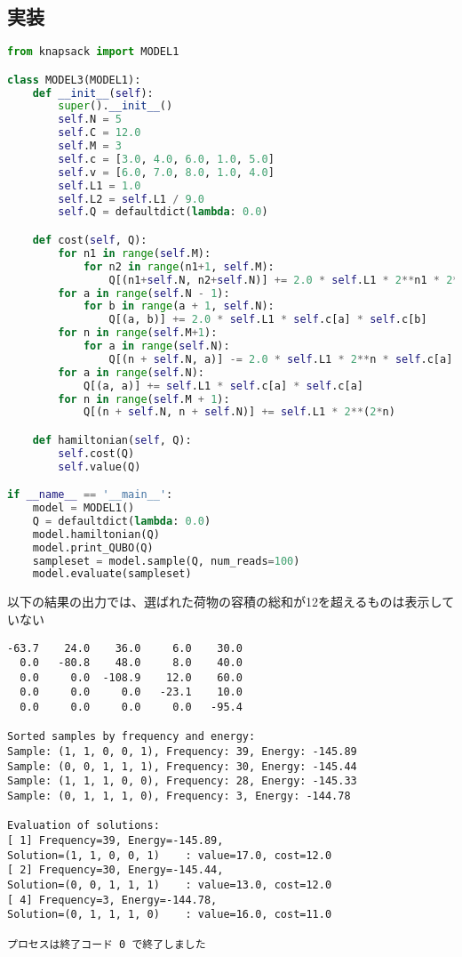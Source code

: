 \documentclass[uplatex,dvipdfmx,a4paper,11pt,oneside,openany]{jsbook}
\begin{document}
\subsection{実装}

\begin{lstlisting}[language=Python]
from knapsack import MODEL1

class MODEL3(MODEL1):
    def __init__(self):
        super().__init__()
        self.N = 5
        self.C = 12.0
        self.M = 3
        self.c = [3.0, 4.0, 6.0, 1.0, 5.0]
        self.v = [6.0, 7.0, 8.0, 1.0, 4.0]
        self.L1 = 1.0
        self.L2 = self.L1 / 9.0
        self.Q = defaultdict(lambda: 0.0)

    def cost(self, Q):
        for n1 in range(self.M):
            for n2 in range(n1+1, self.M):
                Q[(n1+self.N, n2+self.N)] += 2.0 * self.L1 * 2**n1 * 2**n2
        for a in range(self.N - 1):
            for b in range(a + 1, self.N):
                Q[(a, b)] += 2.0 * self.L1 * self.c[a] * self.c[b]
        for n in range(self.M+1):
            for a in range(self.N):
                Q[(n + self.N, a)] -= 2.0 * self.L1 * 2**n * self.c[a]
        for a in range(self.N):
            Q[(a, a)] += self.L1 * self.c[a] * self.c[a]
        for n in range(self.M + 1):
            Q[(n + self.N, n + self.N)] += self.L1 * 2**(2*n)

    def hamiltonian(self, Q):
        self.cost(Q)
        self.value(Q)

if __name__ == '__main__':
    model = MODEL1()
    Q = defaultdict(lambda: 0.0)
    model.hamiltonian(Q)
    model.print_QUBO(Q)
    sampleset = model.sample(Q, num_reads=100)
    model.evaluate(sampleset)
\end{lstlisting}

以下の結果の出力では、選ばれた荷物の容積の総和が12を超えるものは表示していない

\begin{verbatim}
-63.7    24.0    36.0     6.0    30.0
  0.0   -80.8    48.0     8.0    40.0
  0.0     0.0  -108.9    12.0    60.0
  0.0     0.0     0.0   -23.1    10.0
  0.0     0.0     0.0     0.0   -95.4

Sorted samples by frequency and energy:
Sample: (1, 1, 0, 0, 1), Frequency: 39, Energy: -145.89
Sample: (0, 0, 1, 1, 1), Frequency: 30, Energy: -145.44
Sample: (1, 1, 1, 0, 0), Frequency: 28, Energy: -145.33
Sample: (0, 1, 1, 1, 0), Frequency: 3, Energy: -144.78

Evaluation of solutions:
[ 1] Frequency=39, Energy=-145.89,
Solution=(1, 1, 0, 0, 1)	: value=17.0, cost=12.0
[ 2] Frequency=30, Energy=-145.44,
Solution=(0, 0, 1, 1, 1)	: value=13.0, cost=12.0
[ 4] Frequency=3, Energy=-144.78,
Solution=(0, 1, 1, 1, 0)	: value=16.0, cost=11.0

プロセスは終了コード 0 で終了しました
\end{verbatim}
\end{document}
